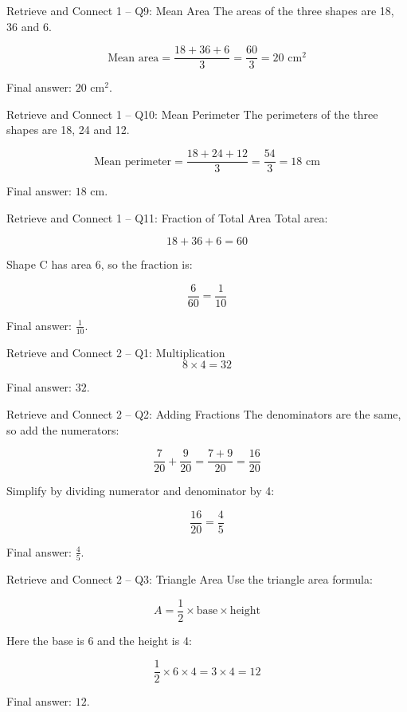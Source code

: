 \documentclass{beamer}
\begin{document}
\begin{frame}{Retrieve and Connect 1 -- Q9: Mean Area}
\small
The areas of the three shapes are 18, 36 and 6.

\[
\text{Mean area}=\frac{18+36+6}{3}=\frac{60}{3}=20\text{ cm}^2
\]

Final answer: \(\boxed{20\text{ cm}^2}\).
\end{frame}

\begin{frame}{Retrieve and Connect 1 -- Q10: Mean Perimeter}
\small
The perimeters of the three shapes are 18, 24 and 12.

\[
\text{Mean perimeter}=\frac{18+24+12}{3}=\frac{54}{3}=18\text{ cm}
\]

Final answer: \(\boxed{18\text{ cm}}\).
\end{frame}

\begin{frame}{Retrieve and Connect 1 -- Q11: Fraction of Total Area}
\small
Total area:

\[
18+36+6=60
\]

Shape C has area 6, so the fraction is:

\[
\frac{6}{60}=\frac{1}{10}
\]

Final answer: \(\boxed{\frac{1}{10}}\).
\end{frame}

\begin{frame}[label=starter2work]{Retrieve and Connect 2 -- Q1: Multiplication}
\small
\[
8 \times 4 = 32
\]

Final answer: \(\boxed{32}\).
\end{frame}

\begin{frame}{Retrieve and Connect 2 -- Q2: Adding Fractions}
\small
The denominators are the same, so add the numerators:

\[
\frac{7}{20}+\frac{9}{20}
=\frac{7+9}{20}
=\frac{16}{20}
\]

Simplify by dividing numerator and denominator by 4:

\[
\frac{16}{20}=\frac{4}{5}
\]

Final answer: \(\boxed{\frac{4}{5}}\).
\end{frame}

\begin{frame}{Retrieve and Connect 2 -- Q3: Triangle Area}
\small
Use the triangle area formula:

\[
A=\frac12 \times \text{base} \times \text{height}
\]

Here the base is 6 and the height is 4:

\[
\frac12 \times 6 \times 4 = 3 \times 4 = 12
\]

Final answer: \(\boxed{12}\).
\end{frame}
\end{document}
